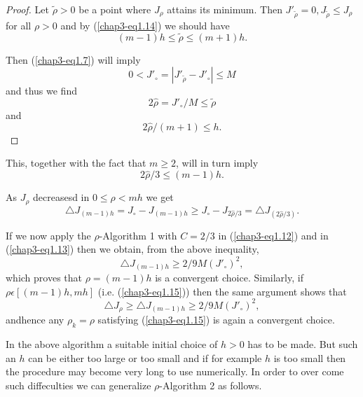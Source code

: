 \begin{proof}
Let $\widetilde{\rho} > 0$ be a point where $J_{\rho}$ attains its minimum. Then ${J'}_{\widetilde{\rho}} = 0, J_{\widetilde{\rho}} \leq J_{\rho}$ for all $\rho > 0$ and by (\ref{chap3-eq1.14}) we should have
\begin{equation*}
(m-1)h \leq \widetilde{\rho} \leq (m+1)h.\tag{1.16}\label{chap3-eq1.16}
\end{equation*}

Then (\ref{chap3-eq1.7}) will imply
$$
0 < {J'}_{\circ} = |{J'}_{\widetilde{\rho}} - {J'}_{\circ}| \leq M
$$
and thus we find
\begin{equation*}
2\hat{\rho} = {J'}_{\circ} / M \leq \widetilde{\rho}\tag{1.17}\label{chap3-eq1.17}
\end{equation*}
and
\begin{equation*}
2\hat{\rho} / (m+1) \leq h.\tag{1.18}\label{chap3-eq1.18}
\end{equation*}
\end{proof}

This, together with the fact that $m \geq 2$, will in turn imply
$$
2\hat{\rho} / 3 \leq (m-1)h.
$$

As $J_{\rho}$ decreasesd in $0 \leq \rho < mh$ we get
$$
\triangle J_{(m-1)h} = J_{\circ} - J_{(m-1)h} \geq J_{\circ} - J_{2\hat{\rho}/3} = \triangle J_{(2 \hat{\rho}/3)}.
$$

If we now apply the $\rho$-Algorithm 1 with $C = 2/3$ in (\ref{chap3-eq1.12}) and in (\ref{chap3-eq1.13}) then we obtain, from the above inequality,
\begin{equation*}
\triangle J_{(m-1)h} \geq 2/ 9M ({J'}_{\circ})^{2},\tag{1.19}\label{chap3-eq1.19}
\end{equation*}
which proves that $\rho = (m-1)h$ is a convergent choice. Similarly, if $\rho \epsilon [(m-1)h, mh]$ (i.e. (\ref{chap3-eq1.15})) then the same argument shows that
\begin{equation*}
\triangle J_{\rho} \geq \triangle J_{(m-1)h} \geq 2/9M ({J'}_{\circ})^{2},\tag{1.20}\label{chap3-eq1.20}
\end{equation*}
and\pageoriginale hence any $\rho_{k} = \rho$ satisfying (\ref{chap3-eq1.15}) is again a convergent choice.

\medskip
{}

In the above algorithm a suitable initial choice of $h > 0$ has to be made. But such an $h$ can be either too large or too small and if for example $h$ is too small then the procedure may become very long to use numerically. In order to over come such diffeculties we can generalize $\rho$-Algorithm 2 as follows.

